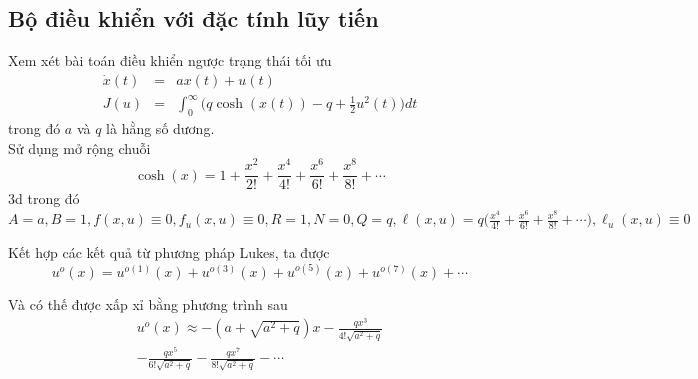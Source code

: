 \documentclass[11pt]{beamer}
\begin{document}
\subsection{Bộ điều khiển với đặc tính lũy tiến}

\begin{frame}
	Xem xét bài toán điều khiển ngược trạng thái tối ưu 
	\begin{eqnarray}
	\dot{x}(t) &=& ax(t) + u(t) \nonumber \\ J(u) &=& \int_{0}^{\infty}\Big(q\cosh(x(t))-q+\frac{1}{2}u^2(t)\Big)dt \nonumber
	\end{eqnarray} trong đó $a$ và $q$ là hằng số dương. \\ Sử dụng mở rộng chuỗi $$\cosh(x) = 1 + \frac{x^2}{2!} + \frac{x^4}{4!} + \frac{x^6}{6!} + \frac{x^8}{8!} + \cdots$$3d trong đó 
	$A=a, B=1, f(x, u)\equiv 0, f_u(x, u) \equiv 0, R=1, N=0, Q=q, \ell(x, u)=q\Big(\frac{x^4}{4!} + \frac{x^6}{6!}+\frac{x^8}{8!} + \cdots\Big) , \ell_u(x, u) \equiv 0$
\end{frame}

\begin{frame}
Kết hợp các kết quả từ phương pháp Lukes, ta được 
\begin{equation}
	u^o(x) = u^{o(1)}(x) + u^{o(3)}(x) + u^{o(5)}(x) + u^{o(7)}(x) + \cdots 
\end{equation}

Và có thế được xấp xỉ bằng phương trình sau
\begin{equation}
\begin{split}
u^o(x) \approx -(a+\sqrt{a^2 + q})x - 
\frac{qx^3}{4!\sqrt{a^2+q}} \\- \frac{qx^5}{6!\sqrt{a^2+q}} - \frac{qx^7}{8!\sqrt{a^2+q}}-\cdots
\end{split}
\end{equation}	
\end{frame}

\section*{}
\end{document}
